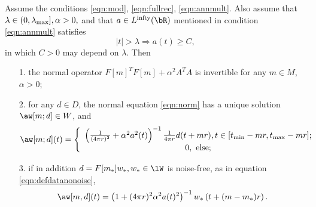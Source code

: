 \begin{theorem}
  \label{thm:norminv}
  Assume the conditions \ref{eqn:mod}, \ref{eqn:fullrec},
  \ref{eqn:annmult}. Also assume that $\lambda \in (0,\lambda_{\rm
    max}], \alpha > 0,$ and that $a \in L^{\rm infty}(\bR)$
  mentioned in condition \ref{eqn:annmult} satisfies
  \begin{equation}
    \label{eqn:abnd}
    |t| > \lambda \Rightarrow a(t) \ge C,
  \end{equation}
  in which $C>0$ may depend on $\lambda$.
  Then
  \begin{itemize}
  \item[1. ]the normal operator $F[m]^TF[m] + \alpha^2A^TA$ is
    invertible for any $m \in M$, $\alpha > 0$;
  \item[2. ]for any $d \in D$, the normal equation \ref{eqn:norm} has
    a unique solution $\aw[m;d]\in W$, and 
    \begin{equation}
      \label{eqn:normsol}
      \aw[m;d](t) = \left\{
        \begin{array}{c}
          \left(\frac{1}{(4\pi r)^2} + \alpha^2
          a^2(t)\right)^{-1}\frac{1}{4 \pi r}d(t+mr), t \in [t_{\rm
          min}-mr, t_{\rm max}-mr];\\
          0, \mbox{ else;}
        \end{array}
      \right.
    \end{equation}
  \item[3. ]if in addition $d=F[m_*]w_*, w_* \in \lW$ is noise-free, as in equation
    \ref{eqn:defdatanonoise},
    \begin{equation}
      \label{eqn:solnnongen}
      \aw[m,d](t)= \left(1+ (4\pi r)^2\alpha^2 a(t)^2\right)^{-1}w_*\left(t+(m-m_*)r\right).
    \end{equation}
  \end{itemize}
\end{theorem}

